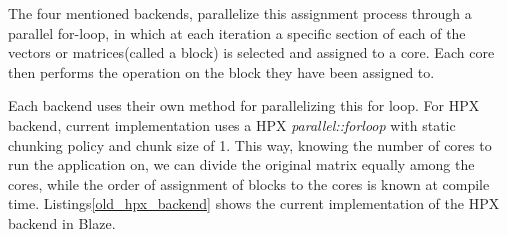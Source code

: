 The four mentioned backends, parallelize this assignment process through a parallel for-loop, in which at each iteration a specific section of each of the vectors or matrices(called a block) is selected and assigned to a core. Each core then performs the operation on the block they have been assigned to.  

Each backend uses their own method for parallelizing this for loop. For HPX backend, current implementation uses a HPX \textit{parallel::for\textunderscore loop} with static chunking policy and chunk size of 1. This way, knowing the number of cores to run the application on, we can divide the original matrix equally among the cores, while the order of assignment of blocks to the cores is known at compile time.  
Listings\ref{old_hpx_backend} shows the current implementation of the HPX backend in Blaze.

